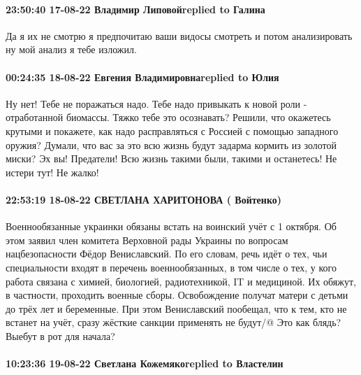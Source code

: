  
 
 
 
 

\paragraph{23:50:40 17-08-22 Владимир Липовойreplied to Галина}

Да я их не смотрю я предпочитаю ваши видосы смотреть и потом анализировать ну
мой анализ я тебе изложил.

\paragraph{00:24:35 18-08-22 Евгения Владимировнаreplied to Юлия}

Ну нет! Тебе не поражаться надо. Тебе надо привыкать к новой роли -
отработанной биомассы. Тяжко тебе это осознавать? Решили, что окажетесь крутыми
и покажете, как надо расправляться с Россией с помощью западного оружия?
Думали, что вас за это всю жизнь будут задарма кормить из золотой миски? Эх вы!
Предатели! Всю жизнь такими были, такими и останетесь! Не истери тут! Не жалко!

\paragraph{22:53:19 18-08-22 СВЕТЛАНА ХАРИТОНОВА ( Войтенко)}

Военнообязанные украинки обязаны встать на воинский учёт с 1 октября.
Об этом заявил член комитета Верховной рады Украины по вопросам нацбезопасности Фёдор Вениславский.
По его словам, речь идёт о тех, чьи специальности входят в перечень военнообязанных, в том числе о тех, у кого работа связана с химией, биологией, радиотехникой, IT и медициной.
Их обяжут, в частности, проходить военные сборы. Освобождение получат матери с детьми до трёх лет и беременные.
При этом Вениславский пообещал, что к тем, кто не встанет на учёт, сразу жёсткие санкции применять не будут/@
Это как блядь?Выебут в рот для начала?🤣🤣🤣

\paragraph{10:23:36 19-08-22 Светлана Кожемякоreplied to Властелин}

